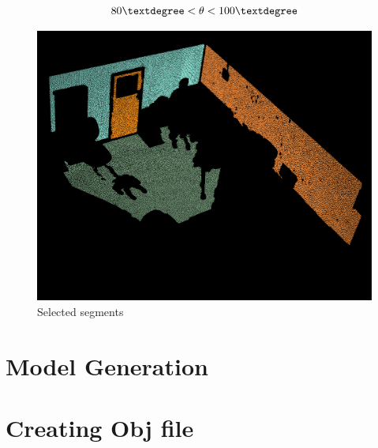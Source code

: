 			\begin{equation}
			80\textdegree < \theta < 100\textdegree
			\end{equation}
			\begin{figure}[H]
				\centering
				\includegraphics[width=0.7\linewidth]{"Includes/images/Selected segments"}
				\caption{Selected segments}
				\label{fig:Selectedsegments}
			\end{figure}
			
	\section{Model Generation}
	
	
	\section{Creating Obj file}
			
					
